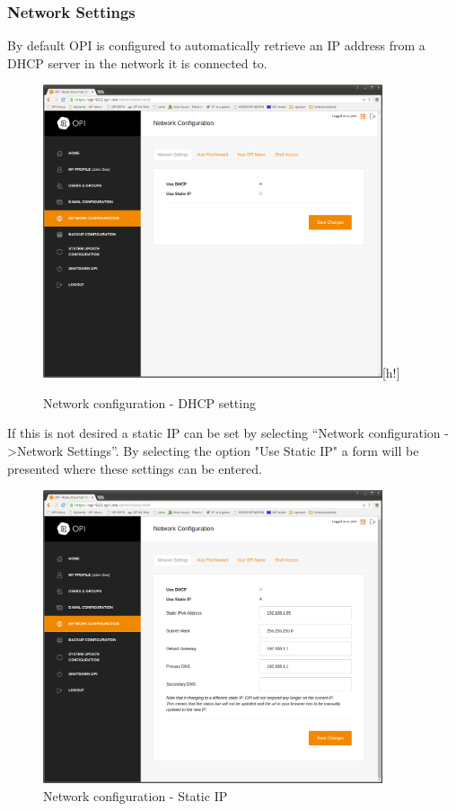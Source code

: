 \documentclass[12pt,a4paper,titlepage]{article}
\begin{document}
\subsubsection{Network Settings}
By default OPI is configured to automatically retrieve an IP address from a DHCP server in the network it is connected to.
\begin{figure}[h!]
\centering
\includegraphics[width=10cm]{./img/network-config-dhcp}[h!]
\caption{Network configuration - DHCP setting}
\end{figure}
If this is not desired a static IP can be set by selecting ``Network configuration -\textgreater Network Settings''. By selecting the option "Use Static IP" a form will be presented where these settings can be entered.
\begin{figure}[h!]
\centering
\includegraphics[width=10cm]{./img/network-config-static}
\caption{Network configuration - Static IP}
\end{figure}
\FloatBarrier
\end{document}
